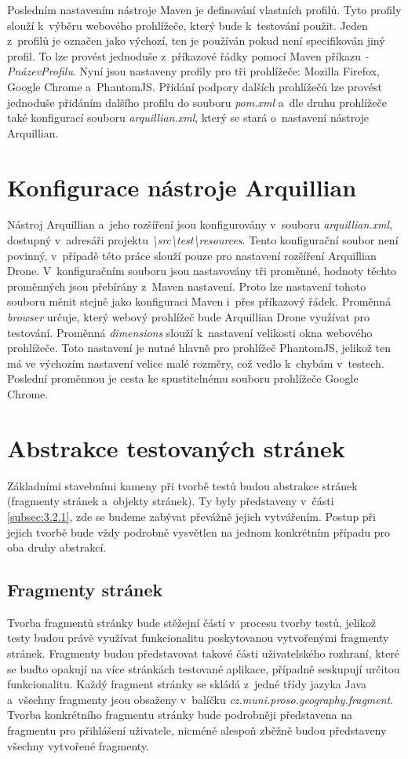 \documentclass[
    color,   %
	table,   %
    twoside, %
    nolot, nolof,
]{fithesis3}
\begin{document}
Posledním nastavením nástroje Maven je definování vlastních profilů. Tyto profily slouží k~výběru webového prohlížeče, který bude k~testování použit. Jeden z~profilů je označen jako výchozí, ten je používán pokud není specifikován jiný profil. To lze provést jednoduše z~příkazové řádky pomocí Maven příkazu \emph{-PnázevProfilu}. Nyní jsou nastaveny profily pro tři prohlížeče: Mozilla Firefox, Google Chrome a~PhantomJS. Přidání podpory dalších prohlížečů lze provést jednoduše přidáním dalšího profilu do souboru \emph{pom.xml} a~dle druhu prohlížeče také konfigurací souboru \emph{arquillian.xml}, který se stará o~nastavení nástroje Arquillian.

\section{Konfigurace nástroje Arquillian}
Nástroj Arquillian a~jeho rozšíření jsou konfigurovány v~souboru \emph{arquillian.xml}, dostupný v~adresáři projektu \emph{\textbackslash src\textbackslash test\textbackslash resources}. Tento konfigurační soubor není povinný, v~případě této práce slouží pouze pro nastavení rozšíření Arquillian Drone. V~konfiguračním souboru jsou nastavovány tři proměnné, hodnoty těchto proměnných jsou přebírány z~Maven nastavení. Proto lze nastavení tohoto souboru měnit stejně jako konfiguraci Maven i~přes příkazový řádek. Proměnná \emph{browser} určuje, který webový prohlížeč bude Arquillian Drone využívat pro testování. Proměnná \emph{dimensions} slouží k~nastavení velikosti okna webového prohlížeče. Toto nastavení je nutné hlavně pro prohlížeč PhantomJS, jelikož ten má ve výchozím nastavení velice malé rozměry, což vedlo k~chybám v~testech. Poslední proměnnou je cesta ke spustitelnému souboru prohlížeče Google Chrome.

\section{Abstrakce testovaných stránek}
\label{sec:5.4}
Základními stavebními kameny při tvorbě testů budou abstrakce stránek (fragmenty stránek a~objekty stránek). Ty byly představeny v~části \ref{subsec:3.2.1}, zde se budeme zabývat převážně jejich vytvářením. Postup při jejich tvorbě bude vždy podrobně vysvětlen na jednom konkrétním případu pro oba druhy abstrakcí.

\subsection{Fragmenty stránek}
\label{subsec:5.4.1}
Tvorba fragmentů stránky bude stěžejní částí v~procesu tvorby testů, jelikož testy budou právě využívat funkcionalitu poskytovanou vytvořenými fragmenty stránek. Fragmenty budou představovat takové části uživatelského rozhraní, které se buďto opakují na více stránkách testované aplikace, případně seskupují určitou funkcionalitu. Každý fragment stránky se skládá z~jedné třídy jazyka Java a~všechny fragmenty jsou obsaženy v~balíčku \emph{cz.muni.proso.geography.fragment}. Tvorba konkrétního fragmentu stránky bude podrobněji představena na fragmentu pro přihlášení uživatele, nicméně alespoň zběžně budou představeny všechny vytvořené fragmenty.
\end{document}
